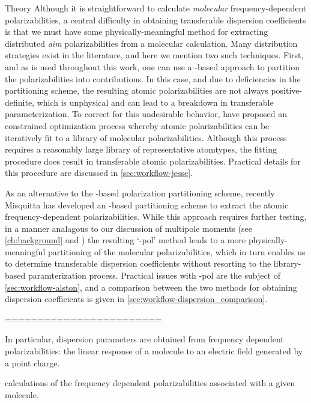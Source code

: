 \begin{subsubsection}{Theory}
Although it is straightforward to calculate \emph{molecular} frequency-dependent
polarizabilities, a central difficulty in obtaining transferable dispersion
coefficients is that we must have some physically-meaningful method for extracting distributed
\emph{\acrlong{aim}} polarizabilities from a molecular calculation. Many
distribution strategies exist in the literature, and here we mention two such
techniques. First, and as is used throughout this work, one can use a
\dma-based approach to partition the polarizabilities into \aim
contributions. In this case, and due to deficiencies in the \dma partitioning
scheme,
the resulting atomic polarizabilities are not always 
positive-definite, which is unphysical and can lead to a breakdown in
transferable parameterization.\cite{Williams2003}
To correct for this undesirable behavior, \citeauthor{McDaniel2013} have
proposed an constrained
optimization process whereby atomic polarizabilities can be iteratively fit to a library
of molecular polarizabilities.\cite{McDaniel2013} Although this process requires a reasonably
large library of representative atomtypes, the fitting
procedure does result in transferable atomic polarizabilities. Practical
details for this procedure are discussed in \cref{sec:workflow-jesse}.

As an alternative to the \dma-based polarization partitioning scheme, recently
Misquitta has developed an \isa-based partitioning scheme to extract the
atomic frequency-dependent polarizabilities. While this approach requires
further testing, in a manner analagous to our discussion of multipole moments (see \cref{ch:background} and
) the resulting `\isa-pol' method leads to a more
physically-meaningful partitioning of the molecular polarizabilities, which in
turn enables us to determine transferable dispersion coefficients without
resorting to the library-based paramterization process. Practical
issues with \isa-pol are the subject of \cref{sec:workflow-alston}, and a
comparison between the two methods for obtaining dispersion coefficients is
given in \cref{sec:workflow-dispersion_comparison}.



========================


In
particular, dispersion parameters are obtained from frequency dependent
polarizabilities: the linear response of a molecule to an electric field
generated by a point charge.

\cite{Williams2003,Misquitta2008}

calculations of the frequency
dependent polarizabilities associated with a given molecule.

\end{subsubsection}

